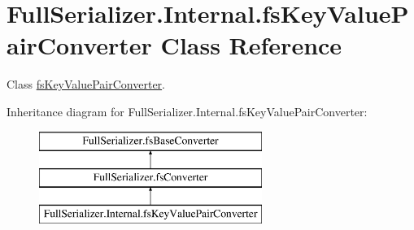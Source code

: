 \hypertarget{class_full_serializer_1_1_internal_1_1fs_key_value_pair_converter}{}\section{Full\+Serializer.\+Internal.\+fs\+Key\+Value\+Pair\+Converter Class Reference}
\label{class_full_serializer_1_1_internal_1_1fs_key_value_pair_converter}


Class \hyperlink{class_full_serializer_1_1_internal_1_1fs_key_value_pair_converter}{fs\+Key\+Value\+Pair\+Converter}.  


Inheritance diagram for Full\+Serializer.\+Internal.\+fs\+Key\+Value\+Pair\+Converter\+:\begin{figure}[H]
\begin{center}
\leavevmode
\includegraphics[height=3.000000cm]{class_full_serializer_1_1_internal_1_1fs_key_value_pair_converter}
\end{center}
\end{figure}
